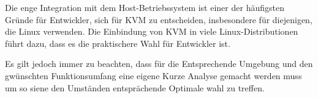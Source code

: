 \documentclass[14pt]{extreport}
\begin{document}
Die enge Integration mit dem Host-Betriebssystem ist einer der häufigsten Gründe für Entwickler, sich für KVM zu entscheiden, insbesondere für diejenigen, die Linux verwenden. Die Einbindung von KVM in viele Linux-Distributionen führt dazu, dass es die praktischere Wahl für Entwickler ist.

Es gilt jedoch immer zu beachten, dass für die Entsprechende Umgebung und den gwünschten Funktionsumfang eine eigene Kurze Analyse gemacht werden muss um so siene den Umständen entsprächende Optimale wahl zu treffen.

\printbibliography
\end{document}
